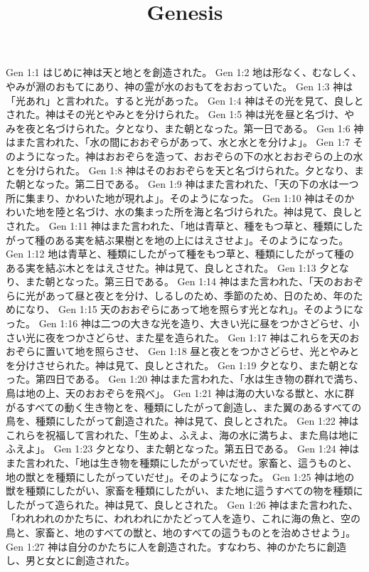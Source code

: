 

\title{Genesis}

Gen 1:1  はじめに神は天と地とを創造された。
Gen 1:2  地は形なく、むなしく、やみが淵のおもてにあり、神の霊が水のおもてをおおっていた。
Gen 1:3  神は「光あれ」と言われた。すると光があった。
Gen 1:4  神はその光を見て、良しとされた。神はその光とやみとを分けられた。
Gen 1:5  神は光を昼と名づけ、やみを夜と名づけられた。夕となり、また朝となった。第一日である。
Gen 1:6  神はまた言われた、「水の間におおぞらがあって、水と水とを分けよ」。
Gen 1:7  そのようになった。神はおおぞらを造って、おおぞらの下の水とおおぞらの上の水とを分けられた。
Gen 1:8  神はそのおおぞらを天と名づけられた。夕となり、また朝となった。第二日である。
Gen 1:9  神はまた言われた、「天の下の水は一つ所に集まり、かわいた地が現れよ」。そのようになった。
Gen 1:10  神はそのかわいた地を陸と名づけ、水の集まった所を海と名づけられた。神は見て、良しとされた。
Gen 1:11  神はまた言われた、「地は青草と、種をもつ草と、種類にしたがって種のある実を結ぶ果樹とを地の上にはえさせよ」。そのようになった。
Gen 1:12  地は青草と、種類にしたがって種をもつ草と、種類にしたがって種のある実を結ぶ木とをはえさせた。神は見て、良しとされた。
Gen 1:13  夕となり、また朝となった。第三日である。
Gen 1:14  神はまた言われた、「天のおおぞらに光があって昼と夜とを分け、しるしのため、季節のため、日のため、年のためになり、
Gen 1:15  天のおおぞらにあって地を照らす光となれ」。そのようになった。
Gen 1:16  神は二つの大きな光を造り、大きい光に昼をつかさどらせ、小さい光に夜をつかさどらせ、また星を造られた。
Gen 1:17  神はこれらを天のおおぞらに置いて地を照らさせ、
Gen 1:18  昼と夜とをつかさどらせ、光とやみとを分けさせられた。神は見て、良しとされた。
Gen 1:19  夕となり、また朝となった。第四日である。
Gen 1:20  神はまた言われた、「水は生き物の群れで満ち、鳥は地の上、天のおおぞらを飛べ」。
Gen 1:21  神は海の大いなる獣と、水に群がるすべての動く生き物とを、種類にしたがって創造し、また翼のあるすべての鳥を、種類にしたがって創造された。神は見て、良しとされた。
Gen 1:22  神はこれらを祝福して言われた、「生めよ、ふえよ、海の水に満ちよ、また鳥は地にふえよ」。
Gen 1:23  夕となり、また朝となった。第五日である。
Gen 1:24  神はまた言われた、「地は生き物を種類にしたがっていだせ。家畜と、這うものと、地の獣とを種類にしたがっていだせ」。そのようになった。
Gen 1:25  神は地の獣を種類にしたがい、家畜を種類にしたがい、また地に這うすべての物を種類にしたがって造られた。神は見て、良しとされた。
Gen 1:26  神はまた言われた、「われわれのかたちに、われわれにかたどって人を造り、これに海の魚と、空の鳥と、家畜と、地のすべての獣と、地のすべての這うものとを治めさせよう」。
Gen 1:27  神は自分のかたちに人を創造された。すなわち、神のかたちに創造し、男と女とに創造された。
